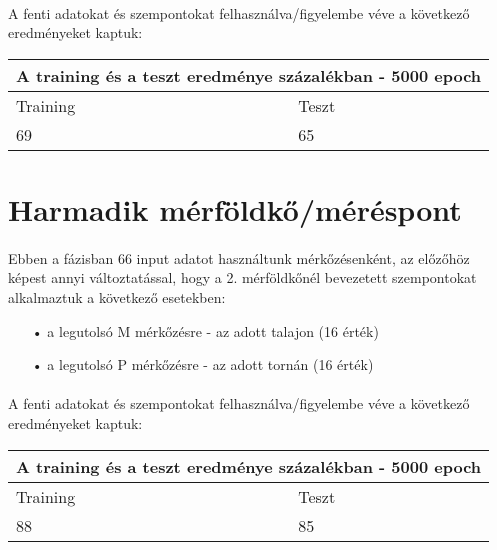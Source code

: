 \paragraph{}
A fenti adatokat és szempontokat felhasználva/figyelembe véve a következő eredményeket kaptuk: 
\begin{center}
\begin{tabular}{ |p{4cm}|p{4cm}|  }
 \hline
 \multicolumn{2}{|c|}{A training és a teszt eredménye százalékban - 5000 epoch} \\
 \hline
  Training & Teszt\\
 \hline
 69 & 65  \\
 \hline
\end{tabular}
\end{center}

\section{Harmadik mérföldkő/méréspont}\label{sec:MAT:bev}
\paragraph{}
Ebben a fázisban 66 input adatot használtunk mérkőzésenként, az előzőhöz képest annyi változtatással, hogy a 2. mérföldkőnél bevezetett szempontokat alkalmaztuk a következő esetekben:
\begin{enumerate}
\item[•] a legutolsó M mérkőzésre - az adott talajon (16 érték)
\item[•] a legutolsó P mérkőzésre - az adott tornán  (16 érték)

\end{enumerate}

\paragraph{}
A fenti adatokat és szempontokat felhasználva/figyelembe véve a következő eredményeket kaptuk: 
\begin{center}
\begin{tabular}{ |p{4cm}|p{4cm}|  }
 \hline
 \multicolumn{2}{|c|}{A training és a teszt eredménye százalékban - 5000 epoch} \\
 \hline
  Training & Teszt\\
 \hline
 88 &  85 \\
 \hline
\end{tabular}
\end{center}

